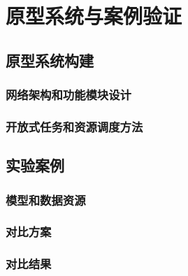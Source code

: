 \chapter{原型系统与案例验证}

\section{原型系统构建}
\subsection{网络架构和功能模块设计}
\subsection{开放式任务和资源调度方法}

\section{实验案例}
\subsection{模型和数据资源}
\subsection{对比方案}
\subsection{对比结果}